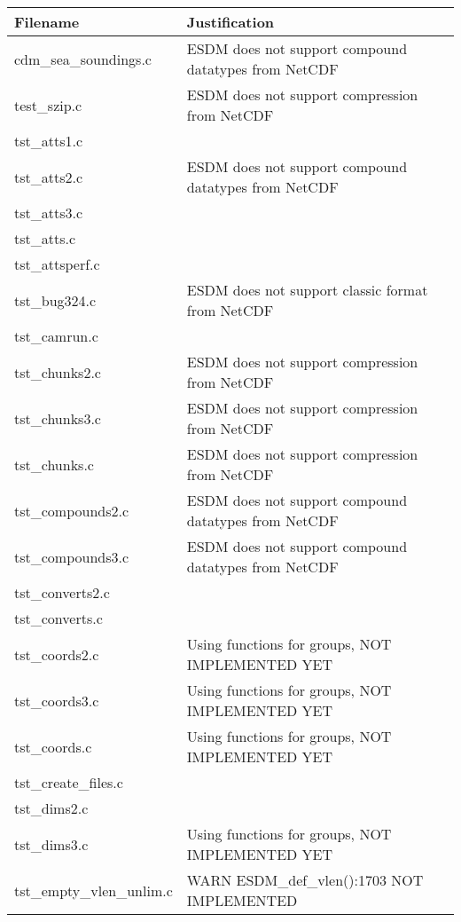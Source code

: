 \begin{table}[H]
\centering
\begin{tabular}{|l|l|}
\hline
Filename & Justification \\ \hline \hline
cdm\_sea\_soundings.c   & ESDM does not support compound datatypes from NetCDF          \\ \hline
test\_szip.c   &  ESDM does not support compression from NetCDF         \\ \hline
tst\_atts1.c   &           \\ \hline
tst\_atts2.c   &  ESDM does not support compound datatypes from NetCDF         \\ \hline
tst\_atts3.c   &           \\ \hline
tst\_atts.c   &           \\ \hline
tst\_attsperf.c   &           \\ \hline
tst\_bug324.c   &  ESDM does not support classic format from NetCDF         \\ \hline
tst\_camrun.c   &           \\ \hline
tst\_chunks2.c   &  ESDM does not support compression from NetCDF         \\ \hline
tst\_chunks3.c   & ESDM does not support compression from NetCDF       \\ \hline
tst\_chunks.c   &  ESDM does not support compression from NetCDF       \\ \hline
tst\_compounds2.c   &  ESDM does not support compound datatypes from NetCDF         \\ \hline
tst\_compounds3.c   &  ESDM does not support compound datatypes from NetCDF         \\ \hline
tst\_converts2.c   &           \\ \hline
tst\_converts.c   &           \\ \hline
tst\_coords2.c   &   Using functions for groups, NOT IMPLEMENTED YET        \\ \hline
tst\_coords3.c   &  Using functions for groups, NOT IMPLEMENTED YET         \\ \hline
tst\_coords.c   &  Using functions for groups, NOT IMPLEMENTED YET         \\ \hline
tst\_create\_files.c   &           \\ \hline
tst\_dims2.c   &       \\ \hline
tst\_dims3.c   & Using functions for groups, NOT IMPLEMENTED YET      \\ \hline
tst\_empty\_vlen\_unlim.c   &   WARN ESDM\_def\_vlen():1703 NOT IMPLEMENTED    \\ \hline

\end{tabular}
\end{table}
